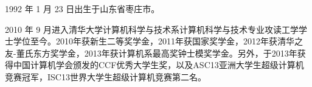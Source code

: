 \begin{resume}


  1992 年 1 月 23 日出生于山东省枣庄市。
  
  2010 年 9 月进入清华大学计算机科学与技术系计算机科学与技术专业攻读工学学士学位至今。2010年获新生二等奖学金，2011年获国家奖学金，2012年获清华之友-董氏东方奖学金，2013年获计算机系最高奖钟士模奖学金。另外，于2013年获得中国计算机学会颁发的CCF优秀大学生奖，以及ASC13亚洲大学生超级计算机竞赛冠军，ISC13世界大学生超级计算机竞赛第二名。
  
\end{resume}
